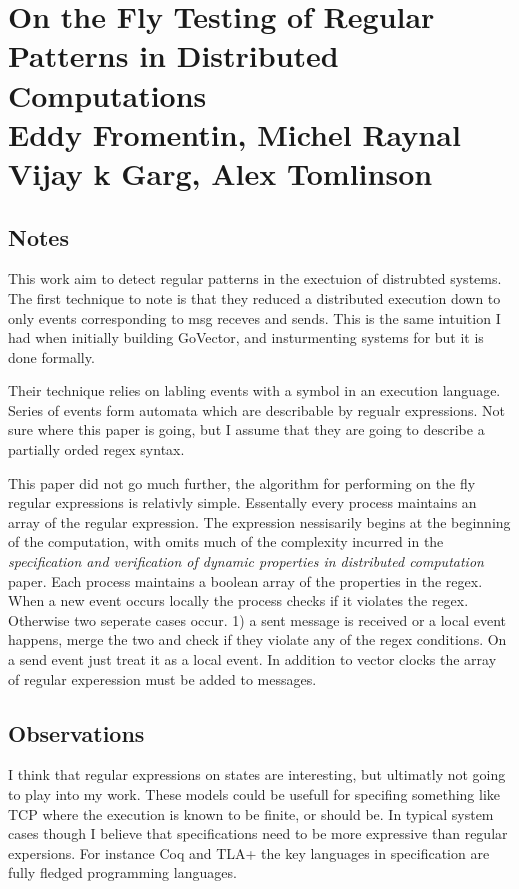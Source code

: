 \section{On the Fly Testing of Regular Patterns in Distributed Computations \\
\small{Eddy Fromentin, Michel Raynal Vijay k Garg, Alex Tomlinson}}

\subsection{Notes}

This work aim to detect regular patterns in the exectuion of distrubted
systems. The first technique to note is that they reduced a distributed
execution down to only events corresponding to msg receves and sends. This is
the same intuition I had when initially building GoVector, and insturmenting
systems for \dinv but it is done formally.

Their technique relies on labling events with a symbol in an execution
language. Series of events form automata which are describable by regualr
expressions. Not sure where this paper is going, but I assume that they are
going to describe a partially orded regex syntax.

This paper did not go much further, the algorithm for performing on the fly
regular expressions is relativly simple. Essentally every process maintains an
array of the regular expression. The expression nessisarily begins at the
beginning of the computation, with omits much of the complexity incurred in the
\textit{specification and verification of dynamic properties in distributed
computation} paper. Each process maintains a boolean array of the properties in
the regex. When a new event occurs locally the process checks if it violates
the regex. Otherwise two seperate cases occur. 1) a sent message is received or
a local event happens, merge the two and check if they violate any of the regex
conditions. On a send event just treat it as a local event. In addition to
vector clocks the array of regular experession must be added to messages.

\subsection{Observations}

I think that regular expressions on states are interesting, but ultimatly not
going to play into my work. These models could be usefull for specifing
something like TCP where the execution is known to be finite, or should be. In
typical system cases though I believe that specifications need to be more
expressive than regular expersions. For instance Coq and TLA+ the key
languages in specification are fully fledged programming languages.


